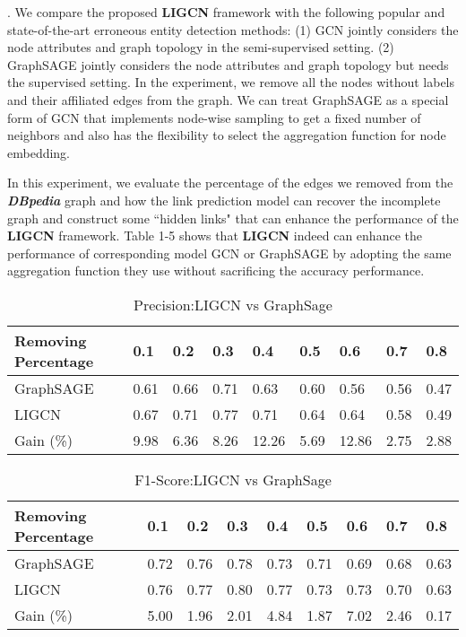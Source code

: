 . We compare the proposed \textbf {LIGCN} framework with the following popular and state-of-the-art erroneous entity detection methods:
(1) GCN \cite{kipf2016semi} jointly considers the node attributes and graph topology in the semi-supervised setting.
(2) GraphSAGE \cite{hamilton2017inductive} jointly considers the node attributes and graph topology but needs the supervised setting. In the experiment, we remove all the nodes without labels and their affiliated edges from the graph. We can treat GraphSAGE as a special form of GCN that implements node-wise sampling to get a fixed number of neighbors and also has the flexibility to select the aggregation function for node embedding.

In this experiment, we evaluate the percentage of the edges we removed from the \textbf{{\em DBpedia}} graph and how the link prediction model can recover the incomplete graph and construct some ``hidden links" that can enhance the performance of the \textbf{LIGCN} framework.
Table 1-5 shows that \textbf{LIGCN} indeed can enhance the performance of corresponding model GCN or GraphSAGE by adopting the same aggregation function they use without sacrificing the accuracy performance. 

\begin{table}[]
\begin{adjustbox}{width=\columnwidth,center}

\begin{tabular}{|l|l|l|l|l|l|l|l|l|}
\hline
 Removing Percentage&  0.1&0.2  &0.3  &0.4  &0.5  &0.6  &0.7  &0.8   \\ \hline
 GraphSAGE & 0.61& 0.66&	0.71&	0.63&	0.60&	0.56&	0.56&	0.47 \\ \hline
 LIGCN & 0.67&	0.71&	0.77&	0.71&	0.64&	0.64&	0.58&	0.49 \\ \hline
 Gain (\%)&9.98&	6.36&	8.26&	12.26&	5.69&	12.86&	2.75&	2.88 \\ \hline
\end{tabular}


\end{adjustbox}
\caption{Precision:LIGCN vs GraphSage}
\label{tab-compare1} 
\end{table}

\begin{table}[]
\begin{adjustbox}{width=\columnwidth,center}

\begin{tabular}{|l|l|l|l|l|l|l|l|l|}
\hline
 Removing Percentage&  0.1&0.2  &0.3  &0.4  &0.5  &0.6  &0.7  &0.8   \\ \hline
 GraphSAGE & 0.72&	0.76&	0.78&	0.73&	0.71&	0.69&	0.68&	0.63	 \\ \hline
LIGCN & 0.76&	0.77&	0.80&	0.77&	0.73&	0.73&	0.70&	0.63 \\ \hline
 Gain (\%)&5.00&	1.96&	2.01&	4.84&	1.87&	7.02&	2.46&	0.17	\\ \hline
\end{tabular}


\end{adjustbox}
\caption{F1-Score:LIGCN vs GraphSage}
\label{tab-compare2} 
\end{table}


